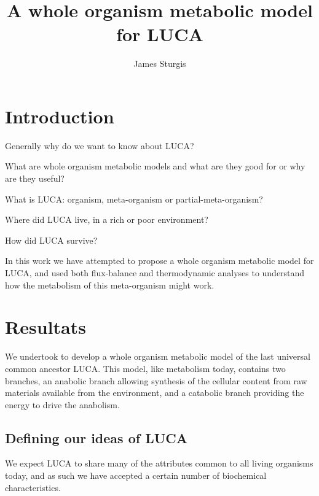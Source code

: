 \documentclass[10pt]{article}
\author{James Sturgis}
\title{A whole organism metabolic model for LUCA}
\begin{document}
\maketitle
\begin{abstract}

\end{abstract}

\section*{Introduction}
Generally why do we want to know about LUCA?

What are whole organism metabolic models and what are they good for or why are they useful?

What is LUCA: organism, meta-organism or partial-meta-organism?

Where did LUCA live, in a rich or poor environment?

How did LUCA survive?

In this work we have attempted to propose a whole organism metabolic model for LUCA, and used both flux-balance and thermodynamic analyses to understand how the metabolism of this meta-organism might work.

\section*{Resultats}

We undertook to develop a whole organism metabolic model of the last universal common ancestor LUCA. This model, like metabolism today, contains two branches, an anabolic branch allowing synthesis of the cellular content from raw materials available from the environment, and a catabolic branch providing the energy to drive the anabolism.

\subsection*{Defining our ideas of LUCA}

We expect LUCA to share many of the attributes common to all living organisms today, and as such we have accepted a certain number of biochemical characteristics.
\end{document}
